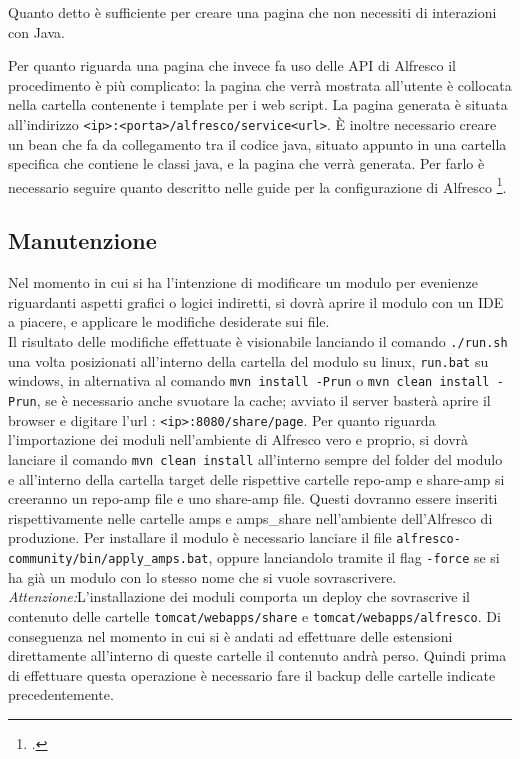 Quanto detto è sufficiente per creare una pagina che non necessiti di interazioni con Java.

Per quanto riguarda una pagina che invece fa uso delle \gls{API} di Alfresco il procedimento è più complicato: la pagina che verrà mostrata all’utente è collocata nella cartella contenente i template per i web script.
La pagina generata è situata all’indirizzo \texttt{<ip>:<porta>/alfresco/service<url>}.
È inoltre necessario creare un bean che fa da collegamento tra il codice java, situato appunto in una cartella specifica che contiene le classi java, e la pagina che verrà generata. Per farlo è necessario seguire quanto descritto nelle guide per la configurazione di Alfresco \footcite{site:alfresco-bean}.

\subsection{Manutenzione}
Nel momento in cui si ha l'intenzione di modificare un modulo per evenienze riguardanti aspetti grafici o logici indiretti, si dovrà aprire il modulo con un IDE a piacere, e applicare le modifiche desiderate sui file.\\
 Il risultato delle modifiche effettuate è visionabile lanciando il comando \texttt{./run.sh} una volta posizionati all’interno della cartella del modulo su linux, \texttt{run.bat} su windows, in alternativa al comando \texttt{mvn install -Prun}  o  \texttt{mvn clean install -Prun}, se è necessario anche svuotare la cache; avviato il server basterà
aprire il browser e digitare l’url : \texttt{<ip>:8080/share/page}.
Per quanto riguarda l’importazione dei moduli nell'ambiente di Alfresco vero e proprio, si dovrà lanciare il comando \texttt{mvn clean install} all'interno sempre del folder del modulo e all’interno della cartella target delle rispettive cartelle repo-amp e share-amp si creeranno un repo-amp file e uno share-amp file. Questi dovranno essere inseriti rispettivamente nelle cartelle amps e amps\_share nell'ambiente dell'Alfresco di produzione.
Per installare il modulo  è necessario lanciare il file \texttt{alfresco-community/bin/apply\_amps.bat}, oppure lanciandolo tramite il flag \texttt{-force} se si ha già un modulo con lo stesso nome che si vuole sovrascrivere.\\
\emph{Attenzione:}L’installazione dei moduli comporta un deploy che sovrascrive il contenuto delle cartelle
\texttt{tomcat/webapps/share} e \texttt{tomcat/webapps/alfresco}. Di conseguenza nel momento in cui si è andati ad effettuare delle estensioni direttamente all’interno di queste cartelle il contenuto andrà perso. Quindi prima di effettuare questa operazione è necessario fare il backup delle cartelle indicate precedentemente.

